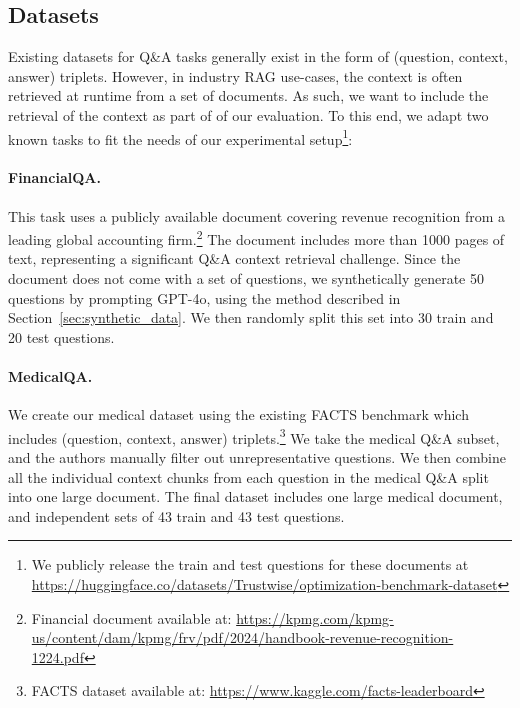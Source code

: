\subsection{Datasets}
\label{sec:datasets}
Existing datasets for Q\&A tasks generally exist in the form of (question, context, answer) triplets. However, in industry RAG use-cases, the context is often retrieved at runtime from a set of documents. As such, we want to include the retrieval of the context as part of of our evaluation. To this end, we adapt two known tasks to fit the needs of our experimental setup\footnote{We publicly release the train and test questions for these documents at \url{https://huggingface.co/datasets/Trustwise/optimization-benchmark-dataset}}:
\paragraph{FinancialQA.}
This task uses a publicly available document covering revenue recognition from a leading global accounting firm.\footnote{Financial document available at: \url{https://kpmg.com/kpmg-us/content/dam/kpmg/frv/pdf/2024/handbook-revenue-recognition-1224.pdf}} The document includes more than 1000 pages of text, representing a significant Q\&A context retrieval challenge. Since the document does not come with a set of questions, we synthetically generate 50 questions by prompting GPT-4o, using the method described in Section~\ref{sec:synthetic_data}. We then randomly split this set into 30 train and 20 test questions.
\paragraph{MedicalQA.}
We create our medical dataset using the existing FACTS benchmark \citep{jacovi2025facts} which includes (question, context, answer) triplets.\footnote{FACTS dataset available at: \url{https://www.kaggle.com/facts-leaderboard}} We take the medical Q\&A subset, and the authors manually filter out unrepresentative questions. We then combine all the individual context chunks from each question in the medical Q\&A split into one large document. The final dataset includes one large medical document, and independent sets of 43 train and 43 test questions.

